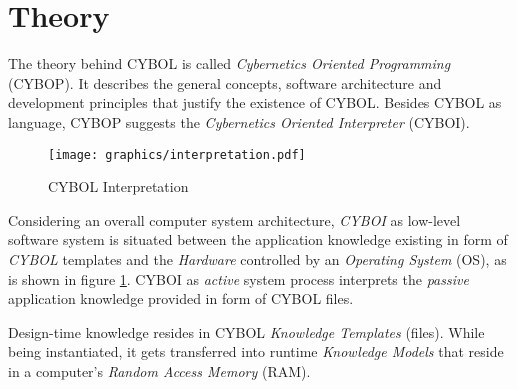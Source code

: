 %
%
%
%
%
%

\section{Theory}
\label{theory_heading}

The theory behind CYBOL is called \emph{Cybernetics Oriented Programming}
(CYBOP). It describes the general concepts, software architecture and
development principles that justify the existence of CYBOL. Besides CYBOL as
language, CYBOP suggests the \emph{Cybernetics Oriented Interpreter} (CYBOI).

\begin{figure}[ht]
    \begin{center}
        \texttt{[image: graphics/interpretation.pdf]}
        \caption{CYBOL Interpretation}
        \label{interpretation_figure}
    \end{center}
\end{figure}

Considering an overall computer system architecture, \emph{CYBOI} as low-level
software system is situated between the application knowledge existing in form
of \emph{CYBOL} templates and the \emph{Hardware} controlled by an
\emph{Operating System} (OS), as is shown in figure \ref{interpretation_figure}.
CYBOI as \emph{active} system process interprets the \emph{passive} application
knowledge provided in form of CYBOL files.

Design-time knowledge resides in CYBOL \emph{Knowledge Templates} (files).
While being instantiated, it gets transferred into runtime
\emph{Knowledge Models} that reside in a computer's \emph{Random Access Memory}
(RAM).
